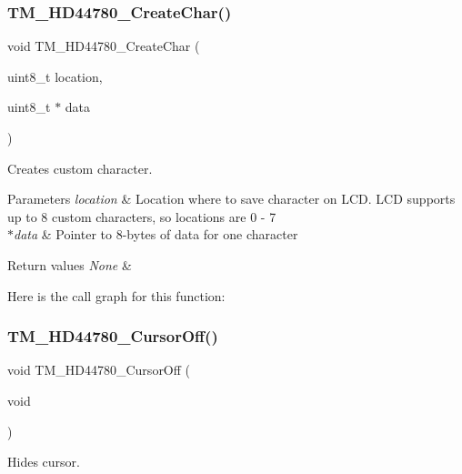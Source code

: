 \subsubsection{\texorpdfstring{T\+M\+\_\+\+H\+D44780\+\_\+\+Create\+Char()}{TM\_HD44780\_CreateChar()}}
{\footnotesize\ttfamily void T\+M\+\_\+\+H\+D44780\+\_\+\+Create\+Char (\begin{DoxyParamCaption}\item[{uint8\+\_\+t}]{location,  }\item[{uint8\+\_\+t $\ast$}]{data }\end{DoxyParamCaption})}



Creates custom character. 


\begin{DoxyParams}{Parameters}
{\em location} & Location where to save character on L\+CD. L\+CD supports up to 8 custom characters, so locations are 0 -\/ 7 \\
\hline
{\em $\ast$data} & Pointer to 8-\/bytes of data for one character \\
\hline
\end{DoxyParams}

\begin{DoxyRetVals}{Return values}
{\em None} & \\
\hline
\end{DoxyRetVals}
Here is the call graph for this function\+:
\mbox{\label{group___t_m___h_d44780___functions_gab469e6dacbf2526bbdac70114edd11ba}} 
\subsubsection{\texorpdfstring{T\+M\+\_\+\+H\+D44780\+\_\+\+Cursor\+Off()}{TM\_HD44780\_CursorOff()}}
{\footnotesize\ttfamily void T\+M\+\_\+\+H\+D44780\+\_\+\+Cursor\+Off (\begin{DoxyParamCaption}\item[{void}]{ }\end{DoxyParamCaption})}



Hides cursor. 


